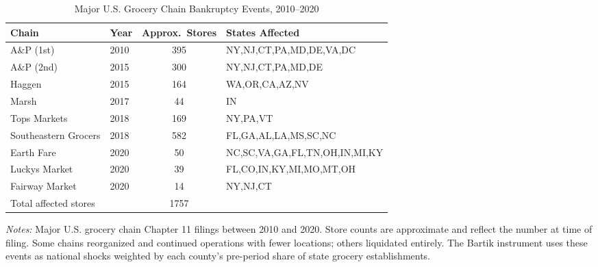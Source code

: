 \begin{table}[htbp]
\centering
\caption{Major U.S. Grocery Chain Bankruptcy Events, 2010--2020}
\label{tab:bankruptcies}
\small
\begin{tabular}{llcl}
\hline\hline
Chain & Year & Approx.\ Stores & States Affected \\
\hline
A\&P (1st) & 2010 & 395 & NY,NJ,CT,PA,MD,DE,VA,DC \\
A\&P (2nd) & 2015 & 300 & NY,NJ,CT,PA,MD,DE \\
Haggen & 2015 & 164 & WA,OR,CA,AZ,NV \\
Marsh & 2017 & 44 & IN \\
Tops Markets & 2018 & 169 & NY,PA,VT \\
Southeastern Grocers & 2018 & 582 & FL,GA,AL,LA,MS,SC,NC \\
Earth Fare & 2020 & 50 & NC,SC,VA,GA,FL,TN,OH,IN,MI,KY \\
Luckys Market & 2020 & 39 & FL,CO,IN,KY,MI,MO,MT,OH \\
Fairway Market & 2020 & 14 & NY,NJ,CT \\
\hline
\multicolumn{2}{l}{Total affected stores} & 1757 & \\
\hline\hline
\end{tabular}
\begin{tablenotes}
\item \textit{Notes:} Major U.S. grocery chain Chapter 11 filings between 2010 and 2020. Store counts are approximate and reflect the number at time of filing. Some chains reorganized and continued operations with fewer locations; others liquidated entirely. The Bartik instrument uses these events as national shocks weighted by each county's pre-period share of state grocery establishments.
\end{tablenotes}
\end{table}
